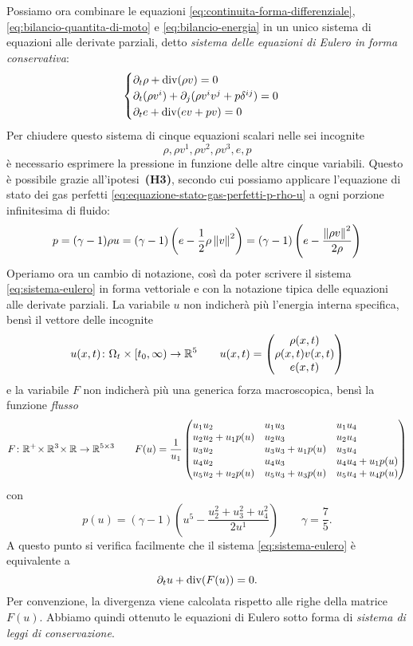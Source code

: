 Possiamo ora combinare le equazioni
\eqref{eq:continuita-forma-differenziale},
\eqref{eq:bilancio-quantita-di-moto} e \eqref{eq:bilancio-energia}
in un unico sistema di equazioni alle derivate parziali,
detto \emph{sistema delle equazioni di Eulero in forma conservativa}:
\begin{equation} \label{eq:sistema-eulero}
\begin{cases}
\partial_t \rho + \operatorname{div}(\rho v) = 0 \\
\partial_t (\rho v^i) + \partial_j (\rho v^i v^j + p\delta^{ij}) = 0 \\
\partial_t e + \operatorname{div}(ev+pv) = 0
\end{cases}
\end{equation}
Per chiudere questo sistema di cinque equazioni scalari nelle sei incognite
\[
\rho, \rho v^1, \rho v^2, \rho v^3, e, p
\]
è necessario esprimere la pressione in funzione delle altre cinque variabili.
Questo è possibile grazie all'ipotesi~\textbf{(H3)}, secondo cui possiamo
applicare l'equazione di stato dei gas perfetti
\eqref{eq:equazione-stato-gas-perfetti-p-rho-u}
a ogni porzione infinitesima di fluido:
\[
p
= (\gamma-1) \rho u
= (\gamma-1) \left( e - \frac{1}{2} \rho \left\lVert v\right\rVert^2 \right)
= (\gamma-1) \left( e - \frac{\left\lVert\rho v\right\rVert^2}{2\rho} \right)
\]
Operiamo ora un cambio di notazione, così da poter
scrivere il sistema \eqref{eq:sistema-eulero} in forma vettoriale e
con la notazione tipica delle equazioni alle derivate parziali.
La variabile $u$ non indicherà più l'energia interna specifica,
bensì il vettore delle incognite
\[
u(x,t) \colon \Omega_t \times [t_0,\infty) \to \mathbb{R}^5
\qquad u(x,t) = \begin{pmatrix} \rho(x,t) \\ \rho(x,t) v(x,t) \\ e(x,t) \end{pmatrix}
\]
e la variabile $F$ non indicherà più una generica forza macroscopica,
bensì la funzione \emph{flusso}
\[
F \colon \R^+ \! \times \R^3 \! \times \R \to \R^{5 \times 3}
\qquad
F(u) =
\frac{1}{u_1}
\begin{pmatrix*}[l]
u_1 u_2            & u_1 u_3            & u_1 u_4            \\
u_2 u_2 + u_1 p(u) & u_2 u_3            & u_2 u_4            \\
u_3 u_2            & u_3 u_3 + u_1 p(u) & u_3 u_4            \\
u_4 u_2            & u_4 u_3            & u_4 u_4 + u_1 p(u) \\
u_5 u_2 + u_2 p(u) & u_5 u_3 + u_3 p(u) & u_5 u_4 + u_4 p(u)
\end{pmatrix*}
\]
con
\begin{equation*}
p(u) = (\gamma-1) \left( u^5 - \frac{u_2^2+u_3^2+u_4^2}{2 u^1} \right)
\qquad \gamma = \frac{7}{5}.
\end{equation*}
A questo punto si verifica facilmente che il sistema \eqref{eq:sistema-eulero}
è equivalente a
\[
\partial_t u + \operatorname{div}(F(u)) = 0.
\]
Per convenzione, la divergenza viene calcolata rispetto alle righe
della matrice $F(u)$.
Abbiamo quindi ottenuto le equazioni di Eulero sotto forma di
\emph{sistema di leggi di conservazione}.

